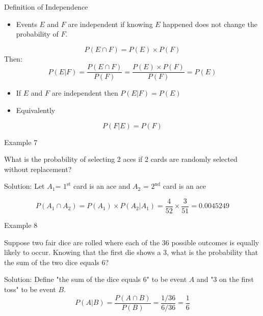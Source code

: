 \documentclass[
  ignorenonframetext,
]{beamer}
\providecommand{\tightlist}{%
  \setlength{\itemsep}{0pt}\setlength{\parskip}{0pt}}
\begin{document}
\begin{frame}{Definition of Independence}
\protect\hypertarget{definition-of-independence}{}
\begin{itemize}
\tightlist
\item
  Events \(E\) and \(F\) are independent if knowing \(E\) happened does
  not change the probability of \(F\).
\end{itemize}

\[P( E \cap  F)=P( E)\times P( F)\] Then:
\[P( E|  F)=\frac{P( E \cap  F)}{P( F)}=\frac{P( E)\times P( F)}{P( F)}=P( E)\]

\begin{itemize}
\item
  If \(E\) and \(F\) are independent then \(P( E| F)=P( E)\)
\item
  Equivalently
\end{itemize}

\[P(F|E)=P( F)\]
\end{frame}

\begin{frame}{Example 7}
\protect\hypertarget{example-7}{}
\begin{tcolorbox}
What is the probability of selecting 2 aces if 2 cards are randomly selected without replacement?
\end{tcolorbox}

\begin{tcolorbox}
Solution:
Let $A_1$= $1^{\text{st}}$ card is an ace and $A_2$ = $2^{\text{nd}}$ card is an ace

$$P(A_1 \cap A_2) = P(A_1)\times P(A_2|A_1) = \frac{4}{52}\times\frac{3}{51} = 0.0045249$$
\end{tcolorbox}
\end{frame}

\begin{frame}{Example 8}
\protect\hypertarget{example-8}{}
\begin{tcolorbox}
Suppose two fair dice are rolled where each of the 36 possible outcomes is equally likely to occur. Knowing that the first die shows a 3, what is the probability that the sum of the two dice equals 6?
\end{tcolorbox}

\begin{tcolorbox}
Solution: 
Define "the sum of the dice equals 6" to be event $A$ and "3 on the first toss" to be event $B$. 
$$P(A|B)=\frac{P(A\cap B)}{P(B)}=\frac{1/36}{6/36}=\frac{1}{6}$$
\end{tcolorbox}
\end{frame}
\end{document}

